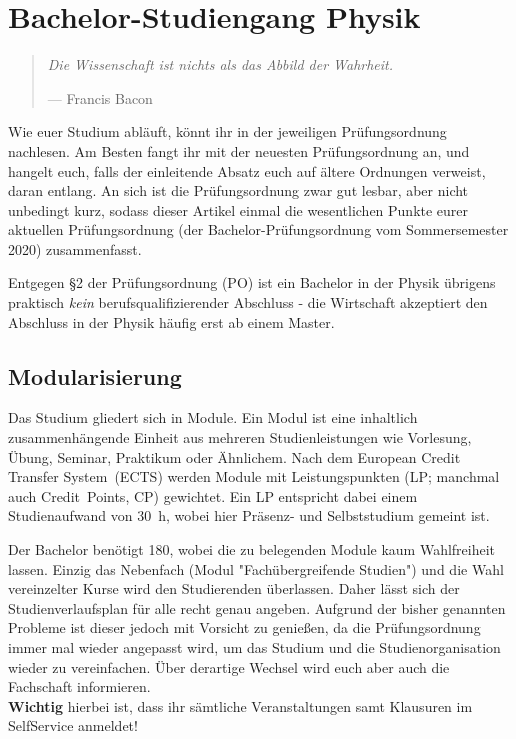 \section[Bachelor-Studiengang Physik]{Bachelor-Studiengang Physik}
\begin{multicols}{2}
\begin{quote}
	\textit{Die Wissenschaft ist nichts als das Abbild der Wahrheit.}
	
	\hfill--- Francis Bacon
\end{quote}

Wie euer Studium abläuft, könnt ihr in der jeweiligen Prüfungsordnung nachlesen. Am Besten fangt ihr mit der neuesten Prüfungsordnung an, und hangelt euch, falls der einleitende Absatz euch auf ältere Ordnungen verweist, daran entlang. An sich ist die Prüfungsordnung zwar gut lesbar, aber nicht unbedingt kurz, sodass dieser Artikel einmal die wesentlichen Punkte eurer aktuellen Prüfungsordnung (der Bachelor-Prüfungsordnung vom Sommersemester 2020) zusammenfasst.

Entgegen §2 der Prüfungsordnung (PO) ist ein Bachelor in der Physik übrigens praktisch \emph{kein} berufsqualifizierender Abschluss - die Wirtschaft akzeptiert den Abschluss in der Physik häufig erst ab einem Master.

\subsection{Modularisierung}
Das Studium gliedert sich in Module.
Ein Modul ist eine inhaltlich zusammenhängende Einheit aus mehreren Studienleistungen wie Vorlesung, Übung, Seminar, Praktikum oder Ähnlichem.
Nach dem European Credit Transfer System~(ECTS) werden Module mit Leistungspunkten (LP; manchmal auch Credit~Points, CP) gewichtet.
Ein LP entspricht dabei einem Studienaufwand von \SI{30}{\hour}, wobei hier Präsenz- und Selbststudium gemeint ist.

Der Bachelor benötigt \SI{180}{\LP}, wobei die zu belegenden Module kaum Wahlfreiheit lassen.
Einzig das Nebenfach (Modul "Fachübergreifende Studien") und die Wahl vereinzelter Kurse wird den Studierenden überlassen.
Daher lässt sich der Studienverlaufsplan für alle recht genau angeben.
Aufgrund der bisher genannten Probleme ist dieser jedoch mit Vorsicht zu genießen, da die Prüfungsordnung immer mal wieder angepasst wird, um das Studium und die Studienorganisation wieder zu vereinfachen.
Über derartige Wechsel wird euch aber auch die Fachschaft informieren.\\
\textbf{Wichtig} hierbei ist, dass ihr sämtliche Veranstaltungen samt Klausuren im SelfService anmeldet!\\
\\


\end{multicols}

